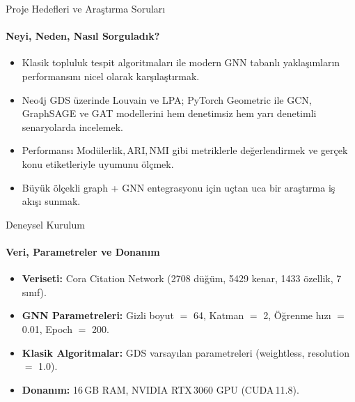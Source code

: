 \documentclass{beamer}
\begin{document}
\begin{frame}{Proje Hedefleri ve Araştırma Soruları}
\framesubtitle{Neyi, Neden, Nasıl Sorguladık?}
    \begin{itemize}
        \item Klasik topluluk tespit algoritmaları ile modern GNN tabanlı yaklaşımların performansını nicel olarak karşılaştırmak.
        \item Neo4j GDS üzerinde Louvain ve LPA; PyTorch Geometric ile GCN, GraphSAGE ve GAT modellerini hem denetimsiz hem yarı denetimli senaryolarda incelemek.
        \item Performansı \( \text{Modülerlik}, \text{ARI}, \text{NMI} \) gibi metriklerle değerlendirmek ve gerçek konu etiketleriyle uyumunu ölçmek.
        \item Büyük ölçekli graph + GNN entegrasyonu için uçtan uca bir araştırma iş akışı sunmak.
    \end{itemize}
\end{frame}

\begin{frame}{Deneysel Kurulum}
\framesubtitle{Veri, Parametreler ve Donanım}
    \begin{itemize}
        \item \textbf{Veriseti:} Cora Citation Network (2708 düğüm, 5429 kenar, 1433 özellik, 7 sınıf).
        \item \textbf{GNN Parametreleri:} Gizli boyut $=$ 64, Katman $=$ 2, Öğrenme hızı $=$ 0.01, Epoch $=$ 200.
        \item \textbf{Klasik Algoritmalar:} GDS varsayılan parametreleri (weightless, resolution $=$ 1.0).
        \item \textbf{Donanım:} 16\,GB RAM, NVIDIA RTX\,3060 GPU (CUDA\,11.8).
    \end{itemize}
\end{frame}
\end{document}

